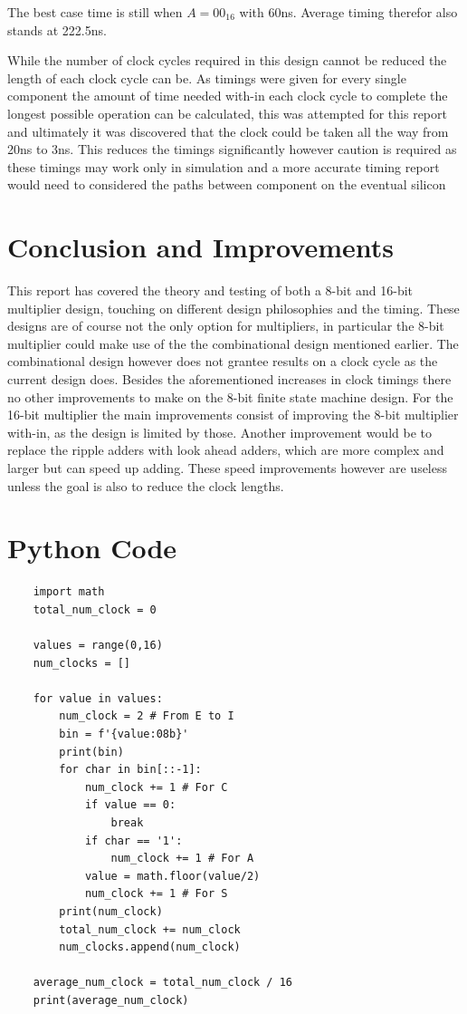 \documentclass[11pt]{article}
\begin{document}
The best case time is still when $A=00_{16}$ with 60ns.
Average timing therefor also stands at 222.5ns.

While the number of clock cycles required in this design cannot be reduced the length of each clock cycle can be.
As timings were given for every single component the amount of time needed with-in each clock cycle to complete the longest possible operation can be calculated,
this was attempted for this report and ultimately it was discovered that the clock could be taken all the way from 20ns to 3ns.
This reduces the timings significantly however caution is required as these timings may work only in simulation and a more accurate timing report would need to considered the paths between component on the eventual silicon

\section{Conclusion and Improvements}
This report has covered the theory and testing of both a 8-bit and 16-bit multiplier design,
touching on different design philosophies and the timing.
These designs are of course not the only option for multipliers, in particular the 8-bit multiplier could make use of the the combinational design mentioned earlier.
The combinational design however does not grantee results on a clock cycle as the current design does.
Besides the aforementioned increases in clock timings there no other improvements to make on the 8-bit finite state machine design.
For the 16-bit multiplier the main improvements consist of improving the 8-bit multiplier with-in, as the design is limited by those.
Another improvement would be to replace the ripple adders with look ahead adders, which are more complex and larger but can speed up adding.
These speed improvements however are useless unless the goal is also to reduce the clock lengths.

\pagebreak
\appendix
\section{Python Code}
\begin{lstlisting}
    import math
    total_num_clock = 0
    
    values = range(0,16)
    num_clocks = []
    
    for value in values:
        num_clock = 2 # From E to I
        bin = f'{value:08b}'
        print(bin)
        for char in bin[::-1]:
            num_clock += 1 # For C
            if value == 0:
                break
            if char == '1':
                num_clock += 1 # For A
            value = math.floor(value/2)
            num_clock += 1 # For S
        print(num_clock)
        total_num_clock += num_clock
        num_clocks.append(num_clock)
    
    average_num_clock = total_num_clock / 16
    print(average_num_clock)
\end{lstlisting}

\pagebreak
\printbibliography
\end{document}
